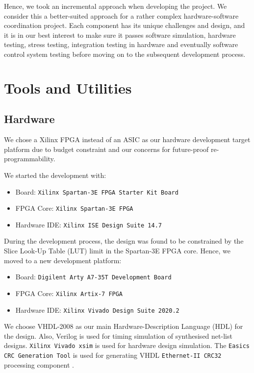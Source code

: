 \documentclass[a4paper]{report}
\newcommand{\proglang}{\textsf}
\newcommand{\code}{\texttt}
\begin{document}
Hence, we took an incremental approach when developing the project. We consider this a better-suited approach for a rather complex hardware-software coordination project. Each component has its unique challenges and design, and it is in our best interest to make sure it passes software simulation, hardware testing, stress testing, integration testing in hardware and eventually software control system testing before moving on to the subsequent development process.

\section{Tools and Utilities}

\subsection{Hardware}
\label{section:introduction-tools-hardware}

We chose a Xilinx FPGA instead of an ASIC as our hardware development target platform due to budget constraint and our concerns for future-proof re-programmability.

We started the development with:
\begin{itemize}
    \item Board: \code{Xilinx Spartan-3E FPGA Starter Kit Board} \cite{xilinx-documentation-2011}
    \item FPGA Core: \code{Xilinx Spartan-3E FPGA} \cite{xilinx-documentation-2011-core}
    \item Hardware IDE: \code{Xilinx ISE Design Suite 14.7} \cite{xilinx-documentation-ise}
\end{itemize}

During the development process, the design was found to be constrained by the Slice Look-Up Table (LUT) limit in the Spartan-3E FPGA core. Hence, we moved to a new development platform:
\begin{itemize}
    \item Board: \code{Digilent Arty A7-35T Development Board} \cite{digilent-arty}
    \item FPGA Core: \code{Xilinx Artix-7 FPGA} \cite{xilinx-documentation-artix}
    \item Hardware IDE: \code{Xilinx Vivado Design Suite 2020.2} \cite{xilinx-documentation-vivado}
\end{itemize}

We choose \proglang{VHDL-2008} \cite{ieee-vhdl} as our main Hardware-Description Language (HDL) for the design. Also, \proglang{Verilog} \cite{ieee-verilog} is used for timing simulation of synthesised net-list designs. \code{Xilinx Vivado xsim} \cite{xilinx-documentation-vivado} is used for hardware design simulation. The \code{Easics CRC Generation Tool} is used for generating \proglang{VHDL} \code{Ethernet-II CRC32} processing component \cite{easics-crc}.
\end{document}
